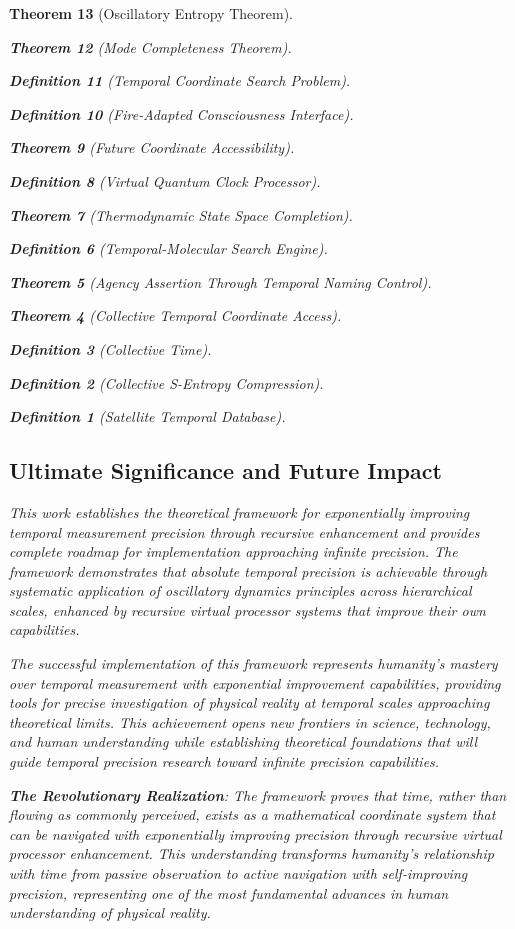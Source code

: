 \documentclass[12pt,a4paper]{article}
\newtheorem{theorem}{Theorem}[section]
\newtheorem{definition}[theorem]{Definition}
\begin{document}
\begin{theorem}[Oscillatory Entropy Theorem]
\begin{theorem}[Mode Completeness Theorem]
\begin{enumerate}
\begin{definition}[Temporal Coordinate Search Problem]
\begin{algorithm}
\begin{definition}[Fire-Adapted Consciousness Interface]
\begin{theorem}[Future Coordinate Accessibility]
\begin{definition}[Virtual Quantum Clock Processor]
\begin{itemize}
\begin{itemize}
\begin{theorem}[Thermodynamic State Space Completion]
\begin{definition}[Temporal-Molecular Search Engine]
\begin{theorem}[Agency Assertion Through Temporal Naming Control]
\begin{remark}
\begin{theorem}[Collective Temporal Coordinate Access]
\begin{definition}[Collective Time]
\begin{definition}[Collective S-Entropy Compression]
\begin{definition}[Satellite Temporal Database]
\begin{algorithm}
\begin{table}[h]
{{\subsection{Ultimate Significance and Future Impact}

This work establishes the theoretical framework for exponentially improving temporal measurement precision through recursive enhancement and provides complete roadmap for implementation approaching infinite precision. The framework demonstrates that absolute temporal precision is achievable through systematic application of oscillatory dynamics principles across hierarchical scales, enhanced by recursive virtual processor systems that improve their own capabilities.

The successful implementation of this framework represents humanity's mastery over temporal measurement with exponential improvement capabilities, providing tools for precise investigation of physical reality at temporal scales approaching theoretical limits. This achievement opens new frontiers in science, technology, and human understanding while establishing theoretical foundations that will guide temporal precision research toward infinite precision capabilities.

\textbf{The Revolutionary Realization}: The framework proves that time, rather than flowing as commonly perceived, exists as a mathematical coordinate system that can be navigated with exponentially improving precision through recursive virtual processor enhancement. This understanding transforms humanity's relationship with time from passive observation to active navigation with self-improving precision, representing one of the most fundamental advances in human understanding of physical reality.

}}
\end{table}
\end{algorithm}
\end{definition}
\end{definition}
\end{definition}
\end{theorem}
\end{remark}
\end{theorem}
\end{definition}
\end{theorem}
\end{itemize}
\end{itemize}
\end{definition}
\end{theorem}
\end{definition}
\end{algorithm}
\end{definition}
\end{enumerate}
\end{theorem}
\end{theorem}
\end{document}
